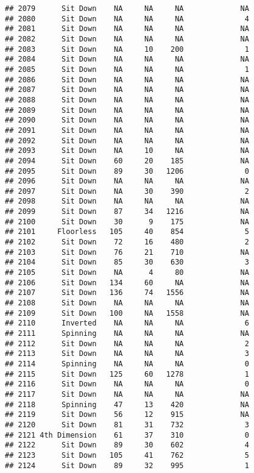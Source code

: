 \documentclass[
]{article}
\begin{document}
\begin{verbatim}
## 2079      Sit Down    NA     NA     NA             NA
## 2080      Sit Down    NA     NA     NA              4
## 2081      Sit Down    NA     NA     NA             NA
## 2082      Sit Down    NA     NA     NA             NA
## 2083      Sit Down    NA     10    200              1
## 2084      Sit Down    NA     NA     NA             NA
## 2085      Sit Down    NA     NA     NA              1
## 2086      Sit Down    NA     NA     NA             NA
## 2087      Sit Down    NA     NA     NA             NA
## 2088      Sit Down    NA     NA     NA             NA
## 2089      Sit Down    NA     NA     NA             NA
## 2090      Sit Down    NA     NA     NA             NA
## 2091      Sit Down    NA     NA     NA             NA
## 2092      Sit Down    NA     NA     NA             NA
## 2093      Sit Down    NA     10     NA             NA
## 2094      Sit Down    60     20    185             NA
## 2095      Sit Down    89     30   1206              0
## 2096      Sit Down    NA     NA     NA             NA
## 2097      Sit Down    NA     30    390              2
## 2098      Sit Down    NA     NA     NA             NA
## 2099      Sit Down    87     34   1216             NA
## 2100      Sit Down    30      9    175             NA
## 2101     Floorless   105     40    854              5
## 2102      Sit Down    72     16    480              2
## 2103      Sit Down    76     21    710             NA
## 2104      Sit Down    85     30    630              3
## 2105      Sit Down    NA      4     80             NA
## 2106      Sit Down   134     60     NA             NA
## 2107      Sit Down   136     74   1556             NA
## 2108      Sit Down    NA     NA     NA             NA
## 2109      Sit Down   100     NA   1558             NA
## 2110      Inverted    NA     NA     NA              6
## 2111      Spinning    NA     NA     NA             NA
## 2112      Sit Down    NA     NA     NA              2
## 2113      Sit Down    NA     NA     NA              3
## 2114      Spinning    NA     NA     NA              0
## 2115      Sit Down   125     60   1278              1
## 2116      Sit Down    NA     NA     NA              0
## 2117      Sit Down    NA     NA     NA             NA
## 2118      Spinning    47     13    420             NA
## 2119      Sit Down    56     12    915             NA
## 2120      Sit Down    81     31    732              3
## 2121 4th Dimension    61     37    310              0
## 2122      Sit Down    89     30    602              4
## 2123      Sit Down   105     41    762              5
## 2124      Sit Down    89     32    995              1

\end{verbatim}
\end{document}
